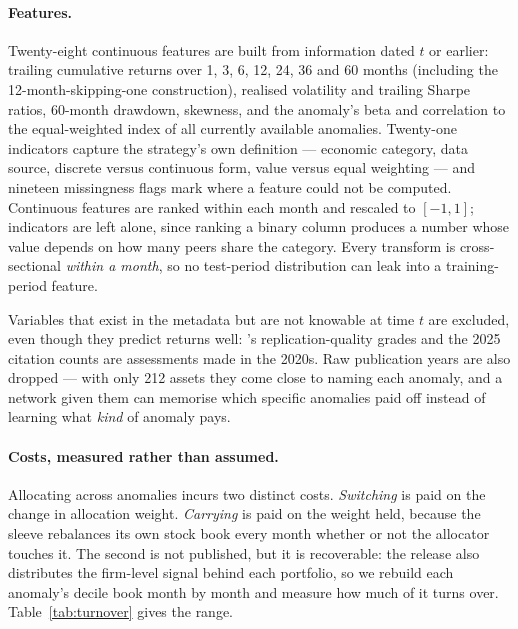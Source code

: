 \documentclass[11pt,a4paper]{article}
\begin{document}
\paragraph{Features.} Twenty-eight continuous features are built from information
dated $t$ or earlier: trailing cumulative returns over 1, 3, 6, 12, 24, 36 and 60
months (including the 12-month-skipping-one construction), realised volatility and
trailing Sharpe ratios, 60-month drawdown, skewness, and the anomaly's beta and
correlation to the equal-weighted index of all currently available anomalies.
Twenty-one indicators capture the strategy's own definition --- economic category,
data source, discrete versus continuous form, value versus equal weighting --- and
nineteen missingness flags mark where a feature could not be computed. Continuous
features are ranked within each month and rescaled to $[-1,1]$; indicators are left
alone, since ranking a binary column produces a number whose value depends on how
many peers share the category. Every transform is cross-sectional \emph{within a
month}, so no test-period distribution can leak into a training-period feature.

Variables that exist in the metadata but are not knowable at time $t$ are
excluded, even though they predict returns well: \citeauthor{ChenZimmermann2022}'s
replication-quality grades and the 2025 citation counts are assessments made in
the 2020s. Raw publication years are also dropped --- with only 212 assets they
come close to naming each anomaly, and a network given them can memorise which
specific anomalies paid off instead of learning what \emph{kind} of anomaly pays.

\paragraph{Costs, measured rather than assumed.} Allocating across anomalies
incurs two distinct costs. \emph{Switching} is paid on the change in allocation
weight. \emph{Carrying} is paid on the weight held, because the sleeve rebalances
its own stock book every month whether or not the allocator touches it. The second
is not published, but it is recoverable: the release also distributes the
firm-level signal behind each portfolio, so we rebuild each anomaly's decile book
month by month and measure how much of it turns over. Table~\ref{tab:turnover}
gives the range.
\end{document}
